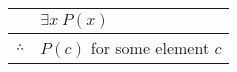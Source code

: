 \documentclass{standalone}
\begin{document}
\begin{tabular}{rl}
    & $\exists x\ P\left(x\right)$  \\
    \hline
    $\therefore$ & $P\left(c\right)$ for some element $c$ \\
\end{tabular}
\end{document}
